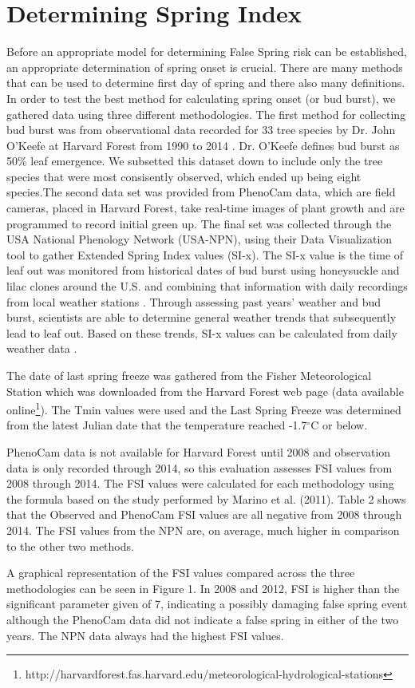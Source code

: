 \documentclass{article}\usepackage[]{graphicx}\usepackage[]{color}
\begin{document}
\section*{Determining Spring Index}
Before an appropriate model for determining False Spring risk can be established, an appropriate determination of spring onset is crucial. There are many methods that can be used to determine first day of spring and there also many definitions. In order to test the best method for calculating spring onset (or bud burst), we gathered data using three different methodologies. The first method for collecting bud burst was from observational data recorded for 33 tree species by Dr. John O'Keefe at Harvard Forest from 1990 to 2014 \citep{OKeefe2014}. 
Dr. O'Keefe defines bud burst as 50\% leaf emergence. We subsetted this dataset down to include only the tree species that were most consisently observed, which ended up being eight species.The second data set was provided from PhenoCam data, which are field cameras, placed in Harvard Forest, take real-time images of plant growth and are programmed to record initial green up. The final set was collected through the USA National Phenology Network (USA-NPN), using their Data Visualization tool to gather Extended Spring Index values (SI-x). The SI-x value is the time of leaf out was monitored from historical dates of bud burst using honeysuckle and lilac clones around the U.S. and combining that information with daily recordings from local weather stations \citep{NPN, Ault2015, Ault2015a, Schwartz2013, Schwartz1997}. 
Through assessing past years' weather and bud burst, scientists are able to determine general weather trends that subsequently lead to leaf out. Based on these trends, SI-x values can be calculated from daily weather data \citep{NPN}.
\par
The date of last spring freeze was gathered from the Fisher Meteorological Station which was downloaded from the Harvard Forest web page (data available online\footnote{http://harvardforest.fas.harvard.edu/meteorological-hydrological-stations}). The Tmin values were used and the Last Spring Freeze was  determined from the latest Julian date that the temperature reached -1.7$^{\circ}$C or below. 
\par
PhenoCam data is not available for Harvard Forest until 2008 and observation data is only recorded through 2014, so this evaluation assesses FSI values from 2008 through 2014.
The FSI values were calculated for each methodology using the formula based on the study performed by Marino et al. (2011). Table 2 shows that the Observed and PhenoCam FSI values are all negative from 2008 through 2014. The FSI values from the NPN are, on average, much higher in comparison to the other two methods.  
\par
A graphical representation of the FSI values compared across the three methodologies can be seen in Figure 1. In 2008 and 2012, FSI is higher than the significant parameter given of 7, indicating a possibly damaging false spring event although the PhenoCam data did not indicate a false spring in either of the two years. The NPN data always had the highest FSI values.
\end{document}
